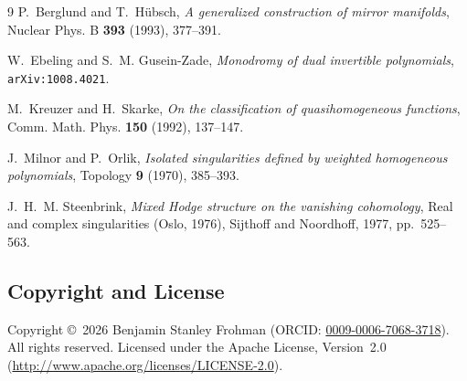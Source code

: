 \documentclass[11pt]{amsart}
\begin{document}
\begin{thebibliography}{9}
P.~Berglund and T.~H\"ubsch, \emph{A generalized construction of mirror manifolds}, Nuclear Phys. B \textbf{393} (1993), 377--391.

W.~Ebeling and S.~M. Gusein-Zade, \emph{Monodromy of dual invertible polynomials}, \texttt{arXiv:1008.4021}.

M.~Kreuzer and H.~Skarke, \emph{On the classification of quasihomogeneous functions}, Comm. Math. Phys. \textbf{150} (1992), 137--147.

J.~Milnor and P.~Orlik, \emph{Isolated singularities defined by weighted homogeneous polynomials}, Topology \textbf{9} (1970), 385--393.

J.~H.~M. Steenbrink, \emph{Mixed Hodge structure on the vanishing cohomology}, Real and complex singularities (Oslo, 1976), Sijthoff and Noordhoff, 1977, pp.~525--563.
\end{thebibliography}

\subsection*{Copyright and License}
Copyright \copyright\ 2026 Benjamin Stanley Frohman (ORCID: \href{https://orcid.org/0009-0006-7068-3718}{0009-0006-7068-3718}). All rights reserved. Licensed under the Apache License, Version~2.0 (\url{http://www.apache.org/licenses/LICENSE-2.0}).
\end{document}
